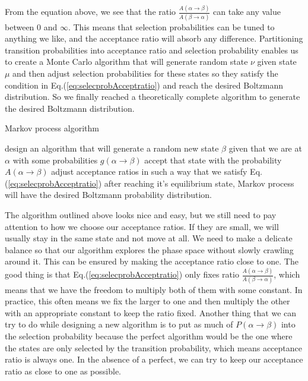 From the equation above, we see that the ratio $\frac{A(\alpha \rightarrow \beta)}{A(\beta \rightarrow \alpha)}$ can take any value between $0$ and $\infty$. This means that selection probabilities can be tuned to anything we like, and the acceptance ratio will absorb any difference. Partitioning transition probabilities into acceptance ratio and selection probability enables us to create a Monte Carlo algorithm that will generate random state $\nu$ given state $\mu$ and then adjust selection probabilities for these states so they satisfy the condition in Eq.(\ref{eq:selecprobAcceptratio}) and reach the desired Boltzmann distribution. So we finally reached a theoretically complete algorithm to generate the desired Boltzmann distribution. 
\begin{algorithm}[H]
	\caption{Markov process algorithm}
	\begin{algorithmic}[1]
		\State design an algorithm that will generate a random new state $\beta$ given that we are at $\alpha$ with some probabilities $g(\alpha \rightarrow \beta)$
		\State accept that state with the probability $A(\alpha \rightarrow \beta)$ 
		\State adjust acceptance ratios in such a way that we satisfy Eq.(\ref{eq:selecprobAcceptratio})
		\State after reaching it's equilibrium state, Markov process will have the desired Boltzmann probability distribution.
	\end{algorithmic}
	\label{algo:Markovchain}
\end{algorithm}
\par
The algorithm outlined above looks nice and easy, but we still need to pay attention to how we choose our acceptance ratios. If they are small, we will usually stay in the same state and not move at all. We need to make a delicate balance so that our algorithm explores the phase space without slowly crawling around it. This can be ensured by making the acceptance ratio close to one. The good thing is that Eq.(\ref{eq:selecprobAcceptratio}) only fixes ratio $\frac{A(\alpha \rightarrow \beta)}{A(\beta \rightarrow \alpha)}$, which means that we have the freedom to multiply both of them with some constant. In practice, this often means we fix the larger to one and then multiply the other with an appropriate constant to keep the ratio fixed. Another thing that we can try to do while designing a new algorithm is to put as much of $P(\alpha \rightarrow \beta)$ into the selection probability because the perfect algorithm would be the one where the states are only selected by the transition probability, which means acceptance ratio is always one. In the absence of a perfect, we can try to keep our acceptance ratio as close to one as possible.

